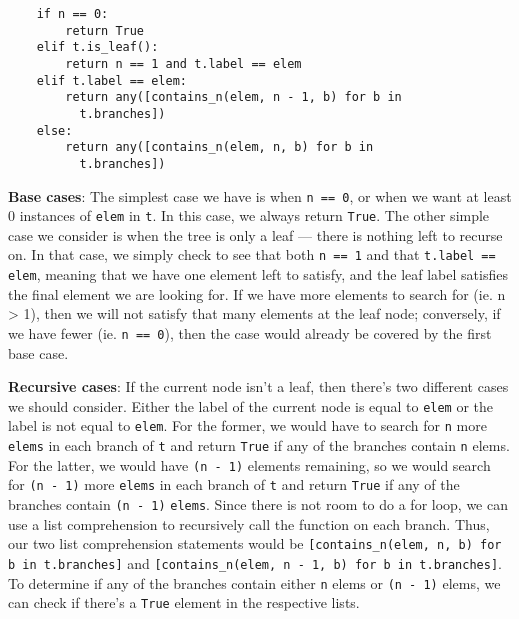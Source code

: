\begin{blocksection}
\begin{solution}
\begin{lstlisting}
    if n == 0:
        return True
    elif t.is_leaf():
        return n == 1 and t.label == elem
    elif t.label == elem:
        return any([contains_n(elem, n - 1, b) for b in     
          t.branches])
    else:
        return any([contains_n(elem, n, b) for b in 
          t.branches])
\end{lstlisting}
\textbf{Base cases}: The simplest case we have is when \lstinline{n == 0}, or when we want at least 0 instances of \lstinline{elem} in \lstinline{t}. In this case, we always return \lstinline{True}. The other simple case we consider is when the tree is only a leaf — there is nothing left to recurse on. In that case, we simply check to see that both \lstinline{n == 1} and that \lstinline{t.label == elem}, meaning that we have one element left to satisfy, and the leaf label satisfies the final element we are looking for. If we have more elements to search for (ie. n > 1), then we will not satisfy that many elements at the leaf node; conversely, if we have fewer (ie. \lstinline{n == 0}), then the case would already be covered by the first base case.

\textbf{Recursive cases}: If the current node isn't a leaf, then there's two different cases we should consider. Either the label of the current node is equal to \lstinline{elem} or the label is not equal to \lstinline{elem}. For the former, we would have to search for \lstinline{n} more \lstinline{elems} in each branch of \lstinline{t} and return \lstinline{True} if any of the branches contain \lstinline{n} elems. For the latter, we would have \lstinline{(n - 1)} elements remaining, so we would search for \lstinline{(n - 1)} more \lstinline{elems} in each branch of \lstinline{t} and return \lstinline{True} if any of the branches contain \lstinline{(n - 1)} \lstinline{elems}. Since there is not room to do a for loop, we can use a list comprehension to recursively call the function on each branch. Thus, our two list comprehension statements would be \lstinline{[contains_n(elem, n, b) for b in t.branches]} and \lstinline{[contains_n(elem, n - 1, b) for b in t.branches]}. To determine if any of the branches contain either \lstinline{n} elems or \lstinline{(n - 1)} elems, we can check if there's a \lstinline{True} element in the respective lists.

\end{solution}


\end{blocksection}
